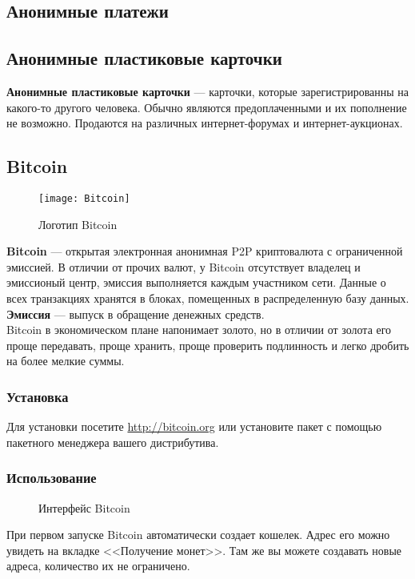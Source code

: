 \begin{enumerate}
\section{Анонимные платежи}
\subsection{Анонимные пластиковые карточки}
\textbf{Анонимные пластиковые карточки} --- карточки, которые зарегистрированны на какого-то другого человека. Обычно являются предоплаченными и их пополнение не возможно. Продаются на различных интернет-форумах и интернет-аукционах.
\subsection{Bitcoin}
\begin{wrapfigure}[6]{r}{0.25\linewidth}
\texttt{[image: Bitcoin]}
\caption{Логотип Bitcoin}
\end{wrapfigure}
\textbf{Bitcoin} --- открытая электронная анонимная P2P криптовалюта с ограниченной эмиссией. В отличии от прочих валют, у Bitcoin отсутствует владелец и эмиссионый центр, эмиссия выполняется каждым участником сети. Данные о всех транзакциях хранятся в блоках, помещенных в распределенную базу данных.\\
\textbf{Эмиссия} --- выпуск в обращение денежных средств.\\
Bitcoin в экономическом плане напонимает золото, но в отличии от золота его проще передавать, проще хранить, проще проверить подлинность и легко дробить на более мелкие суммы.
\subsubsection{Установка}
Для установки посетите \url{http://bitcoin.org} или установите пакет с помощью пакетного менеджера вашего дистрибутива.
\subsubsection{Использование}
\begin{figure}[h]
\caption{Интерфейс Bitcoin}
\end{figure}
При первом запуске Bitcoin автоматически создает кошелек. Адрес его можно увидеть на вкладке <<Получение монет>>. Там же вы можете создавать новые адреса, количество их не ограничено.

\end{enumerate}
